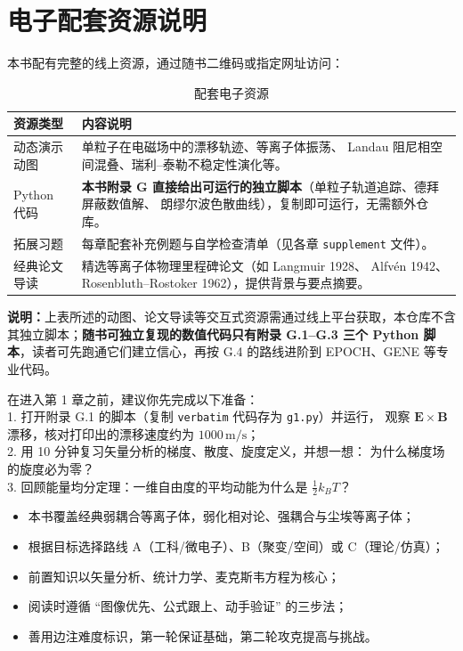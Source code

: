 \documentclass[12pt,a4paper,openany,oneside]{book}
\newcommand{\vect}[1]{\bm{#1}}
\begin{document}
\section*{电子配套资源说明}

本书配有完整的线上资源，通过随书二维码或指定网址访问：

\begin{table}[htbp]
\centering
\caption{配套电子资源}
\begin{tabular}{@{}lp{9cm}@{}}
\toprule
\textbf{资源类型} & \textbf{内容说明} \\
\midrule
动态演示动图 & 单粒子在电磁场中的漂移轨迹、等离子体振荡、
Landau 阻尼相空间混叠、瑞利--泰勒不稳定性演化等。 \\
Python 代码 & \textbf{本书附录 G 直接给出可运行的独立脚本}（单粒子轨道追踪、德拜屏蔽数值解、
朗缪尔波色散曲线），复制即可运行，无需额外仓库。 \\
拓展习题 & 每章配套补充例题与自学检查清单（见各章 \texttt{supplement} 文件）。 \\
经典论文导读 & 精选等离子体物理里程碑论文（如 Langmuir 1928、
Alfv\'{e}n 1942、Rosenbluth--Rostoker 1962），提供背景与要点摘要。 \\
\bottomrule
\end{tabular}
\end{table}

\textbf{说明：}上表所述的动图、论文导读等交互式资源需通过线上平台获取，本仓库不含其独立脚本；\textbf{随书可独立复现的数值代码只有附录 G.1--G.3 三个 Python 脚本}，读者可先跑通它们建立信心，再按 G.4 的路线进阶到 EPOCH、GENE 等专业代码。

\begin{miniquiz}
在进入第 1 章之前，建议你先完成以下准备：\\
1. 打开附录 G.1 的脚本（复制 \texttt{verbatim} 代码存为 \texttt{g1.py}）并运行，
观察 $\vect{E}\times\vect{B}$ 漂移，核对打印出的漂移速度约为 $1000\,\mathrm{m/s}$；\\
2. 用 10 分钟复习矢量分析的梯度、散度、旋度定义，并想一想：
为什么梯度场的旋度必为零？\\
3. 回顾能量均分定理：一维自由度的平均动能为什么是 $\frac12k_BT$？
\end{miniquiz}

\begin{chapterreview}
\begin{itemize}
\item 本书覆盖经典弱耦合等离子体，弱化相对论、强耦合与尘埃等离子体；
\item 根据目标选择路线 A（工科/微电子）、B（聚变/空间）或 C（理论/仿真）；
\item 前置知识以矢量分析、统计力学、麦克斯韦方程为核心；
\item 阅读时遵循 ``图像优先、公式跟上、动手验证'' 的三步法；
\item 善用边注难度标识，第一轮保证基础，第二轮攻克提高与挑战。
\end{itemize}
\end{chapterreview}
\end{document}

